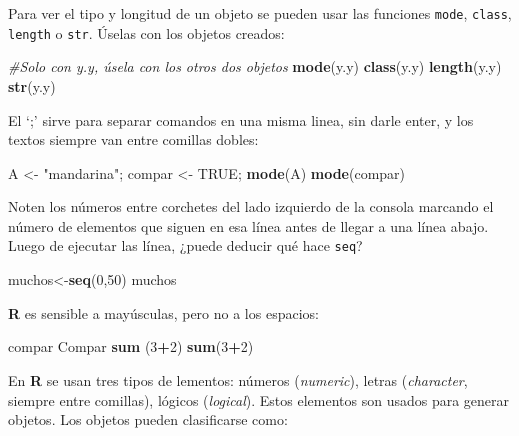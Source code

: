 \documentclass[]{article}
\newenvironment{Shaded}{\begin{snugshade}}{\end{snugshade}}
\newcommand{\CommentTok}[1]{\textcolor[rgb]{0.56,0.35,0.01}{\textit{#1}}}
\newcommand{\DecValTok}[1]{\textcolor[rgb]{0.00,0.00,0.81}{#1}}
\newcommand{\KeywordTok}[1]{\textcolor[rgb]{0.13,0.29,0.53}{\textbf{#1}}}
\newcommand{\NormalTok}[1]{#1}
\newcommand{\OperatorTok}[1]{\textcolor[rgb]{0.81,0.36,0.00}{\textbf{#1}}}
\newcommand{\OtherTok}[1]{\textcolor[rgb]{0.56,0.35,0.01}{#1}}
\newcommand{\StringTok}[1]{\textcolor[rgb]{0.31,0.60,0.02}{#1}}
\begin{document}
Para ver el tipo y longitud de un objeto se pueden usar las funciones
\texttt{mode}, \texttt{class}, \texttt{length} o \texttt{str}. Úselas
con los objetos creados:

\begin{Shaded}
\begin{Highlighting}[]
\CommentTok{#Solo con y.y, úsela con los otros dos objetos}
\KeywordTok{mode}\NormalTok{(y.y)}
\KeywordTok{class}\NormalTok{(y.y)}
\KeywordTok{length}\NormalTok{(y.y)}
\KeywordTok{str}\NormalTok{(y.y)}
\end{Highlighting}
\end{Shaded}

El `;' sirve para separar comandos en una misma linea, sin darle enter,
y los textos siempre van entre comillas dobles:

\begin{Shaded}
\begin{Highlighting}[]
\NormalTok{A <-}\StringTok{ "mandarina"}\NormalTok{; compar <-}\StringTok{ }\OtherTok{TRUE}\NormalTok{; }\KeywordTok{mode}\NormalTok{(A)}
\KeywordTok{mode}\NormalTok{(compar)}
\end{Highlighting}
\end{Shaded}

Noten los números entre corchetes del lado izquierdo de la consola
marcando el número de elementos que siguen en esa línea antes de llegar
a una línea abajo. Luego de ejecutar las línea, ¿puede deducir qué hace
\texttt{seq}?

\begin{Shaded}
\begin{Highlighting}[]
\NormalTok{muchos<-}\KeywordTok{seq}\NormalTok{(}\DecValTok{0}\NormalTok{,}\DecValTok{50}\NormalTok{)}
\NormalTok{muchos}
\end{Highlighting}
\end{Shaded}

\textbf{R} es sensible a mayúsculas, pero no a los espacios:

\begin{Shaded}
\begin{Highlighting}[]
\NormalTok{compar}
\NormalTok{Compar}
\KeywordTok{sum}\NormalTok{    (}\DecValTok{3}\OperatorTok{+}\DecValTok{2}\NormalTok{)}
\KeywordTok{sum}\NormalTok{(}\DecValTok{3}\OperatorTok{+}\DecValTok{2}\NormalTok{)}
\end{Highlighting}
\end{Shaded}

En \textbf{R} se usan tres tipos de lementos: números (\emph{numeric}),
letras (\emph{character}, siempre entre comillas), lógicos
(\emph{logical}). Estos elementos son usados para generar objetos. Los
objetos pueden clasificarse como:
\end{document}
